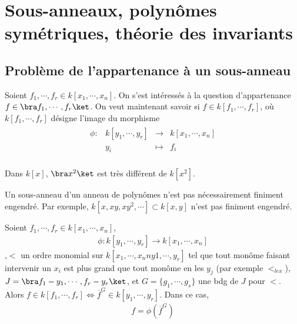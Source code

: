 \chapter{Sous-anneaux, polynômes symétriques, théorie des invariants}
    \section{Problème de l'appartenance à un sous-anneau}
        Soient $f_1, \cdots, f_r \in k[x_1, \cdots, x_n]$. On s'est intéressés à la question d'appartenance $f \in \bra f_1, \cdots, f_r \ket$. On veut maintenant savoir si $f \in k[f_1, \cdots, f_r]$, où $k[f_1, \cdots, f_r]$ désigne l'image du morphisme 
        \begin{align*}
            \begin{array}{cccc}
                \phi : & k[y_1, \cdots, y_r] & \to & k[x_1, \cdots, x_n] \\
                & y_i & \mapsto & f_i \\
            \end{array}
        \end{align*}
        \begin{expl}
            Dans $k[x]$, $\bra x^2 \ket$ est très différent de $k[x^2]$.
        \end{expl}
        \begin{remq}
            Un sous-anneau d'un anneau de polynômes n'est pas nécessairement finiment engendré. Par exemple, $k[x, xy, xy^2, \cdots] \subset k[x,y]$ n'est pas finiment engendré.
        \end{remq}
        \begin{prop}
            Soient $f_1, \cdots, f_r \in k[x_1, \cdots, x_n]$, 
            \begin{align*}
                \phi : k[y_1, \cdots, y_r] \to k[x_1, \cdots, x_n]
            \end{align*}
            ,$<$ un ordre monomial sur $k[x_1, \cdots, x_nn y1, \cdots, y_r]$ tel que tout monôme faisant intervenir un $x_i$ est plus grand que tout monôme en les $y_j$ (par exemple $<_{lex}$), $J = \bra f_1 - y_1, \cdots, f_r - y_r \ket$, et $G = \{g_1, \cdots, g_s\}$ une bdg de $J$ pour $<$. Alors $f \in k[f_1, \cdots, f_r] \iff \overline{f}^G \in k[y_1, \cdots, y_r]$. Dans ce cas,
            \begin{align*}
                f = \phi(\overline{f}^G)
            \end{align*}
        \end{prop}
